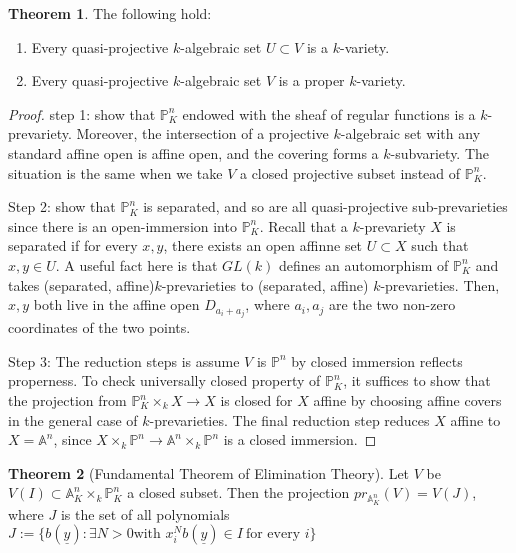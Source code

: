 \documentclass{article}
\theoremstyle{definition}
\newtheorem{theorem}{Theorem}[section]
\theoremstyle{definition}
\theoremstyle{definition}
\theoremstyle{definition}
\theoremstyle{definition}
\theoremstyle{definition}
\theoremstyle{definition}
\begin{document}
\begin{tcolorbox}[colback=red!5!white,colframe=red!30!white]
\begin{theorem}
The following hold: 
\begin{enumerate}
    \item Every quasi-projective $k$-algebraic set $U\subset V$ is a $k$-variety. 
    \item Every quasi-projective $k$-algebraic set $V$ is a proper $k$-variety. 
\end{enumerate}
\end{theorem}
\end{tcolorbox}
\begin{proof}
    step 1: show that $\mathbb{P}^n_K$ endowed with the sheaf of regular functions is a $k$-prevariety. Moreover, the intersection of a projective $k$-algebraic set with any standard affine open is affine open, and the covering forms a $k$-subvariety. The situation is the same when we take $V$ a closed projective subset instead of $\mathbb{P}^n_K$. 

    Step 2: show that $\mathbb{P}^n_K$ is separated, and so are all quasi-projective sub-prevarieties since there is an open-immersion into $\mathbb{P}^n_K$. Recall that a $k$-prevariety $X$ is separated if for every $x,y$, there exists an open affinne set $U\subset X$ such that $x,y\in U$. A useful fact here is that $GL(k)$ defines an automorphism of $\mathbb{P}^n_K$ and takes (separated, affine)$k$-prevarieties to (separated, affine) $k$-prevarieties. Then, $x,y$ both live in the affine open $D_{a_i+a_j}$, where $a_i,a_j$ are the two non-zero coordinates of the two points. 

    Step 3: The reduction steps is assume $V$ is $\mathbb{P}^n$ by closed immersion reflects properness. To check universally closed property of $\mathbb{P}^n_K$, it suffices to show that the projection from $\mathbb{P}^n_K\times_k X\to X$ is closed for $X$ affine by choosing affine covers in the general case of $k$-prevarieties. The final reduction step reduces $X$ affine to $X=\mathbb{A}^n$, since $X\times_k \mathbb{P}^n\to \mathbb{A}^n\times_k \mathbb{P}^n$ is a closed immersion.

\end{proof}



\begin{tcolorbox}[colback=red!5!white,colframe=red!30!white]
\begin{theorem}[Fundamental Theorem of Elimination Theory]
Let $V$ be  $V(I)\subset \mathbb{A}^n_K\times_k \mathbb{P}^n_K$ a closed subset. Then the projection $pr_{\mathbb{A}^n_K}(V)=V(J)$, where $J$ is the set of all polynomials $J:=\{ b(\underline{y}):\exists N>0 \textrm{with } x_i^Nb(\underline{y})\in I \ \textrm{for every } i \}$
\end{theorem}
\end{tcolorbox}
\end{document}
